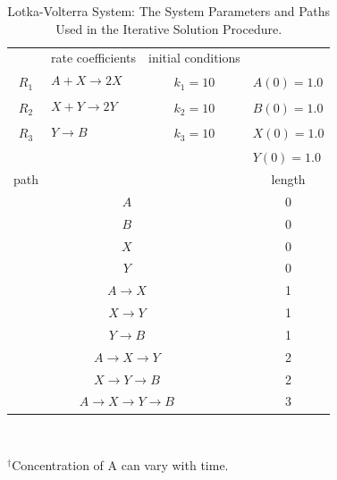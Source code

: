 \begin{table}[htb]
    \caption[Lotka-Volterra System]{Lotka-Volterra System: The System Parameters
and Paths Used in the Iterative Solution Procedure.}
    \begin{center}
\begin{tabular}{clcc}
\rowcolor[HTML]{C0C0C0} 
\multicolumn{2}{c}{\cellcolor[HTML]{C0C0C0}reactions}               & rate coefficients    & initial conditions             \\
$R_1$                & $A+X \xrightarrow[]{} 2X$                    & $k_1 = 10$           & \multicolumn{1}{l}{$A(0)=1.0$} \\
$R_2$                & $X+Y \xrightarrow[]{} 2Y$                    & $k_2 = 10$           & \multicolumn{1}{l}{$B(0)=1.0$} \\
$R_3$                & $Y \xrightarrow[]{} B$                       & $k_3 = 10$           & \multicolumn{1}{l}{$X(0)=1.0$} \\
\multicolumn{1}{l}{} &                                              & \multicolumn{1}{l}{} & \multicolumn{1}{l}{$Y(0)=1.0$} \\
\rowcolor[HTML]{C0C0C0} 
path                 & \multicolumn{1}{c}{\cellcolor[HTML]{C0C0C0}} &                      & length                         \\
\multicolumn{3}{c}{$A$}                                                                    & 0                              \\
\multicolumn{3}{c}{$B$}                                                                    & 0                              \\
\multicolumn{3}{c}{$X$}                                                                    & 0                              \\
\multicolumn{3}{c}{$Y$}                                                                    & 0                              \\
\multicolumn{3}{c}{$A \rightarrow X$}                                                      & 1                              \\
\multicolumn{3}{c}{$X \rightarrow Y$}                                                      & 1                              \\
\multicolumn{3}{c}{$Y \rightarrow B$}                                                      & 1                              \\
\multicolumn{3}{c}{$A \rightarrow X \rightarrow Y$}                                        & 2                              \\
\multicolumn{3}{c}{$X \rightarrow Y \rightarrow B$}                                        & 2                              \\
\multicolumn{3}{c}{$A \rightarrow X \rightarrow Y \rightarrow B$}                          & 3                             
\end{tabular}
   \\ \rule{0mm}{5mm}
   ${}^\dagger$Concentration of A can vary with time.		%
\end{center}
\label{ch4:table1}
\end{table}

